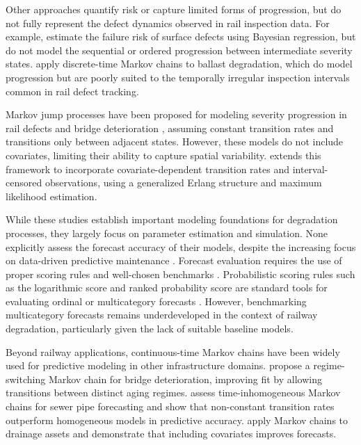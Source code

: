 \documentclass{article}
\begin{document}
Other approaches quantify risk or capture limited forms of progression, but do not fully represent the defect dynamics observed in rail inspection data. For example, \citet{jamshidi2016a} estimate the failure risk of surface defects using Bayesian regression, but do not model the sequential or ordered progression between intermediate severity states. \citet{bressi2021a} apply discrete-time Markov chains to ballast degradation, which do model progression but are poorly suited to the temporally irregular inspection intervals common in rail defect tracking.

Markov jump processes have been proposed for modeling severity progression in rail defects \citep{podofillini2006a} and bridge deterioration \citep{sun2024a}, assuming constant transition rates and transitions only between adjacent states. However, these models do not include covariates, limiting their ability to capture spatial variability. \citet{bisgaard2024A} extends this framework to incorporate covariate-dependent transition rates and interval-censored observations, using a generalized Erlang structure and maximum likelihood estimation.

While these studies establish important modeling foundations for degradation processes, they largely focus on parameter estimation and simulation. None explicitly assess the forecast accuracy of their models, despite the increasing focus on data-driven predictive maintenance \citep{Binder2023}. Forecast evaluation requires the use of proper scoring rules \citep{Gneiting2007} and well-chosen benchmarks \citep{Hyndman2014}. Probabilistic scoring rules such as the logarithmic score and ranked probability score are standard tools for evaluating ordinal or multicategory forecasts \citep{Epstein1969,friedman1983a}. However, benchmarking multicategory forecasts remains underdeveloped in the context of railway degradation, particularly given the lack of suitable baseline models.

Beyond railway applications, continuous-time Markov chains have been widely used for predictive modeling in other infrastructure domains. \citet{Mizutani2023RegimeSwitching} propose a regime-switching Markov chain for bridge deterioration, improving fit by allowing transitions between distinct aging regimes. \citet{JimenezRoa2024Nonhomogeneous} assess time-inhomogeneous Markov chains for sewer pipe forecasting and show that non-constant transition rates outperform homogeneous models in predictive accuracy. \citet{Wu2021ConditionPrediction} apply Markov chains to drainage assets and demonstrate that including covariates improves forecasts. 
\end{document}
